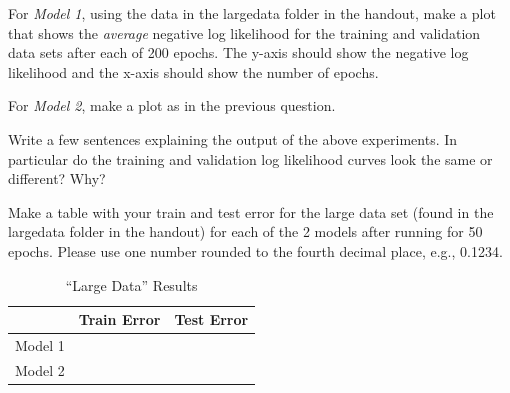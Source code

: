 \documentclass[11pt]{exam}
\numberwithin{equation}{section} %
\numberwithin{figure}{section} %
\numberwithin{table}{section} %
\begin{document}
\begin{questions}
    
\question[2]
For \emph{Model 1}, using the data in the largedata folder in the handout, make a plot that shows the \textit{average} negative log likelihood for the training and validation data sets after each of 200 epochs. The y-axis should show the negative log likelihood and the x-axis should show the number of epochs.  


    \begin{your_solution}
    \bigskip \bigskip \bigskip \bigskip \bigskip \bigskip \bigskip \bigskip
    \bigskip \bigskip \bigskip \bigskip \bigskip
  
    \end{your_solution}

\question[2]
For \emph{Model 2}, make a plot as in the previous question.
        
    \begin{your_solution}
    \bigskip \bigskip \bigskip \bigskip \bigskip \bigskip \bigskip \bigskip
    \bigskip \bigskip \bigskip \bigskip \bigskip \bigskip \bigskip \bigskip
  
    \end{your_solution}

\clearpage


\question[2]
Write a few sentences explaining the output of the above experiments. In particular do the training and validation log likelihood curves look the same or different? Why?

    \begin{your_solution}
    \bigskip \bigskip \bigskip \bigskip \bigskip \bigskip \bigskip \bigskip
    \bigskip \bigskip \bigskip \bigskip \bigskip
  
    \end{your_solution}

\question[2]
Make a table with your train and test error for the large data set (found in the largedata folder in the handout) for each of the 2 models after running for 50 epochs. Please use one number rounded to the  fourth decimal place, e.g., 0.1234.

\begin{your_solution}
     \begin{table}[H]
        \centering
        \begin{tabular}{l|l|l}
        \toprule
        & Train Error & Test Error \\ 
        \midrule
        Model 1      &         &         \\ 
        Model 2 &         &         \\ 
        \bottomrule
        \end{tabular}
        \caption{``Large Data'' Results}
        \label{results}
    \end{table}
\end{your_solution}




\newpage
\end{questions}
\end{document}
